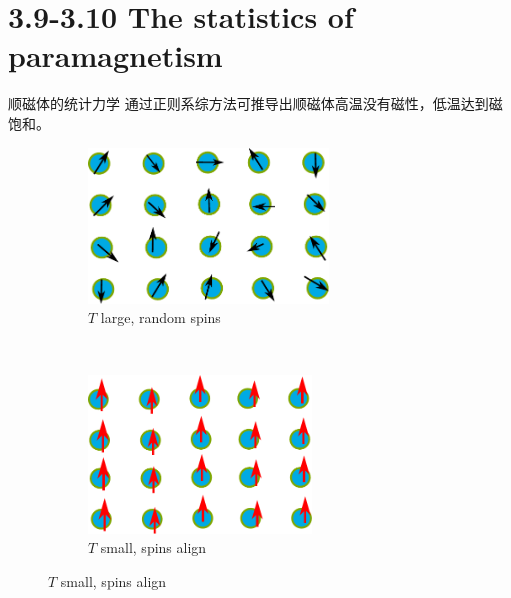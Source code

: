 \documentclass{ctexbeamer}
\begin{document}
\section{3.9-3.10 The statistics of paramagnetism}
\begin{frame}{顺磁体的统计力学}
    通过正则系综方法可推导出顺磁体高温没有磁性，低温达到磁饱和。
    \begin{figure}
        \centering
        \begin{subfigure}{0.4\textwidth}
            \includegraphics[width=0.7\textwidth]{Tlarge.pdf}
            \caption{$T$ large, random spins}
        \end{subfigure}~
        \begin{subfigure}{0.4\textwidth}
            \includegraphics[width=0.65\textwidth]{Tsmall.pdf}
            \caption{$T$ small, spins align}
        \end{subfigure}
    \end{figure}
\end{frame}
\end{document}
